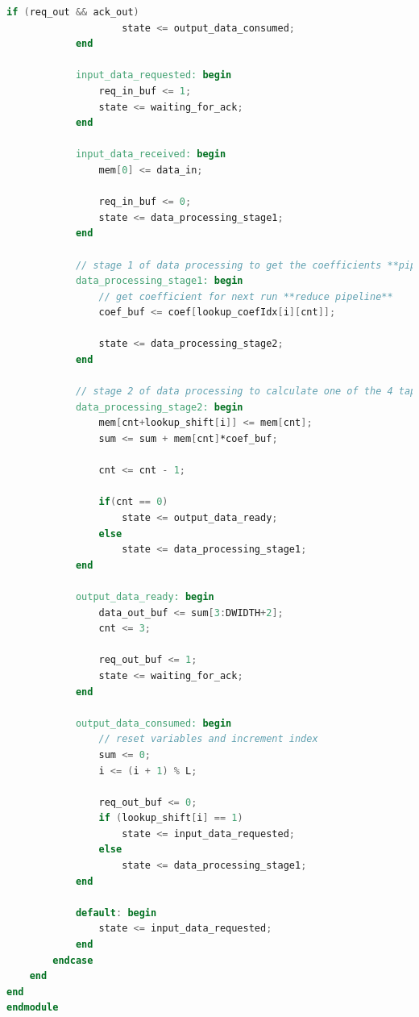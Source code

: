 \documentclass[a4paper,twoside,11pt, fleqn]{article}
\begin{document}
\begin{lstlisting}[language=Verilog]
                if (req_out && ack_out)
                    state <= output_data_consumed;
            end

            input_data_requested: begin
                req_in_buf <= 1;
                state <= waiting_for_ack;
            end

            input_data_received: begin
                mem[0] <= data_in;

                req_in_buf <= 0;
                state <= data_processing_stage1;
            end

            // stage 1 of data processing to get the coefficients **pipelining**
            data_processing_stage1: begin
                // get coefficient for next run **reduce pipeline**
                coef_buf <= coef[lookup_coefIdx[i][cnt]];

                state <= data_processing_stage2;
            end

            // stage 2 of data processing to calculate one of the 4 taps
            data_processing_stage2: begin
                mem[cnt+lookup_shift[i]] <= mem[cnt];
                sum <= sum + mem[cnt]*coef_buf;

                cnt <= cnt - 1;

                if(cnt == 0)
                    state <= output_data_ready;
                else
                    state <= data_processing_stage1;
            end

            output_data_ready: begin
                data_out_buf <= sum[3:DWIDTH+2];
                cnt <= 3;

                req_out_buf <= 1;
                state <= waiting_for_ack;
            end

            output_data_consumed: begin
                // reset variables and increment index
                sum <= 0;
                i <= (i + 1) % L;

                req_out_buf <= 0;
                if (lookup_shift[i] == 1)
                    state <= input_data_requested;
                else
                    state <= data_processing_stage1;
            end

            default: begin
                state <= input_data_requested;
            end
        endcase
    end
end
endmodule
\end{lstlisting}
\end{document}

